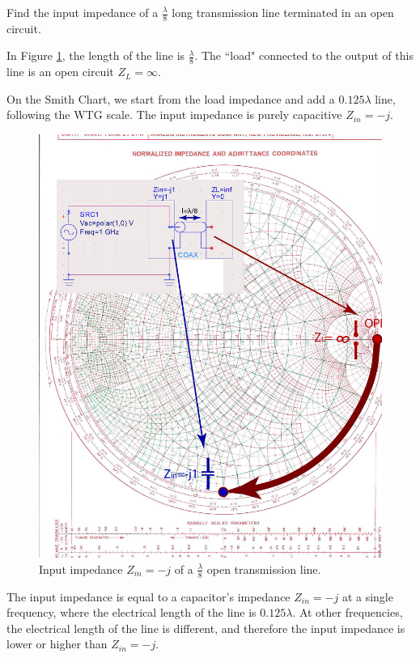 \documentclass{ximera}
\begin{document}
\begin{example}

Find the input impedance of a $\frac{\lambda}{8}$ long transmission line terminated in an open circuit.

\begin{explanation}

In Figure \ref{fig:OpenStubLambdaOver8}, the length of the line is  $\frac{\lambda}{8}$. The ``load" connected to the output of this line is an open circuit $Z_L=\infty$. 


On the Smith Chart, we start from the load impedance and add a $0.125 \lambda$ line, following the WTG scale. The input impedance is purely capacitive $Z_{in}=-j$. 

\begin{figure}[htbp]
\begin{center}
\includegraphics[scale=0.87]{../jpg/openstub-01.jpg}
\end{center}
\caption{Input impedance $Z_{in}=-j$ of a $\frac{\lambda}{8}$ open transmission line.}
\label{fig:OpenStubLambdaOver8}
\end{figure}

The input impedance is equal to a capacitor's impedance $Z_{in}=-j$ at a single frequency, where the electrical length of the line is $0.125 \lambda$. At other frequencies, the electrical length of the line is different, and therefore the input impedance is lower or higher than $Z_{in}=-j$.

\end{explanation}
\end{example}
\end{document}
